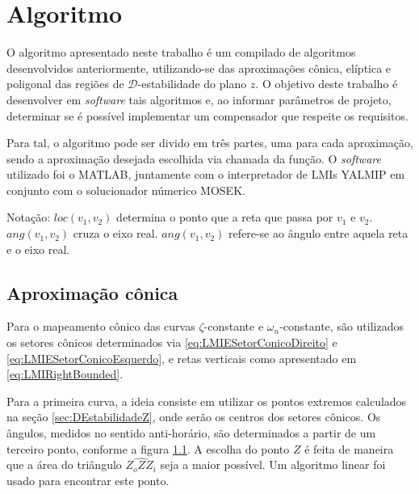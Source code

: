 \chapter{Algoritmo}

O algoritmo apresentado neste trabalho é um compilado de algoritmos desenvolvidos anteriormente, utilizando-se das aproximações cônica, elíptica e poligonal das regiões de $\mathscr{D}$-estabilidade do plano $z$. O objetivo deste trabalho é desenvolver em \emph{software} tais algoritmos e, ao informar parâmetros de projeto, determinar se é possível implementar um compensador que respeite os requisitos.

Para tal, o algoritmo pode ser divido em três partes, uma para cada aproximação, sendo a aproximação desejada escolhida via chamada da função. O \emph{software} utilizado foi o MATLAB, juntamente com o interpretador de LMIs YALMIP em conjunto com o solucionador númerico MOSEK.

Notação: $loc(v_1, v_2)$ determina o ponto que a reta que passa por $v_1$ e $v_2$. $ang(v_1, v_2)$ cruza o eixo real. $ang(v_1, v_2)$ refere-se ao ângulo entre aquela reta e o eixo real. 

\section{Aproximação cônica}
Para o mapeamento cônico das curvas $\zeta$-constante e $\omega_n$-constante, são utilizados os setores cônicos determinados via \eqref{eq:LMIESetorConicoDireito} e \eqref{eq:LMIESetorConicoEsquerdo}, e retas verticais como apresentado em \ref{eq:LMIRightBounded}.

Para a primeira curva, a ideia consiste em utilizar os pontos extremos calculados na seção \ref{sec:DEstabilidadeZ}, onde serão os centros dos setores cônicos. Os ângulos, medidos no sentido anti-horário, são determinados a partir de um terceiro ponto, conforme a figura \ref{subfig:AproximacaoConicaZeta}. A escolha do ponto $Z$ é feita de maneira que a área do triângulo $\widehat{Z_oZZ_i}$ seja a maior possível. Um algoritmo linear foi usado para encontrar este ponto.

\begin{figure}[!hb]
  \centering
  \begin{subfigure}[t]{0.4\columnwidth}
      
      \caption{}
      \label{subfig:AproximacaoConicaZeta}
  \end{subfigure}
  \begin{subfigure}[t]{0.4\columnwidth}
      
      \caption{}
      \label{subfig:AproximacaoConicaWn}
  \end{subfigure}
  \caption{}
  \label{fig:AproximacoesConica}
\end{figure}

